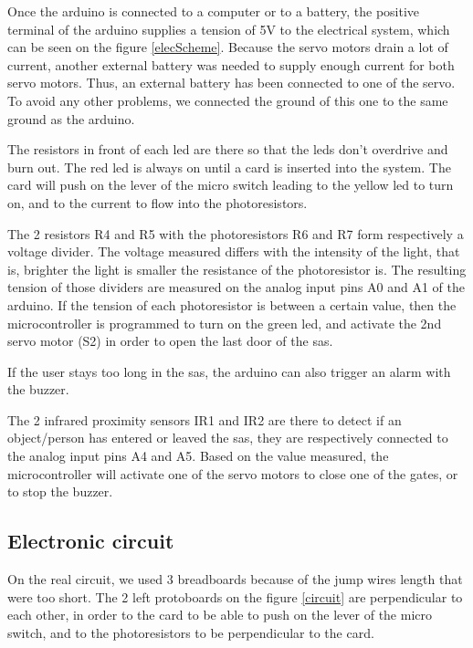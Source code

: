 Once the arduino is connected to a computer or to a battery, the positive terminal of the arduino supplies a tension of 5V to the electrical system, which can be seen on the figure \ref{elecScheme}. Because the servo motors drain a lot of current, another external battery was needed to supply enough current for both servo motors. Thus, an external battery has been connected to one of the servo. To avoid any other problems, we connected the ground of this one to the same ground as the arduino.

The resistors in front of each led are there so that the leds don't overdrive and burn out. The red led is always on until a card is inserted into the system. The card will push on the lever of the micro switch leading to the yellow led to turn on, and to the current to flow into the photoresistors.

The 2 resistors R4 and R5 with the photoresistors R6 and R7 form respectively a voltage divider. The voltage measured differs with the intensity of the light, that is, brighter the light is smaller the resistance of the photoresistor is. The resulting tension of those dividers are measured on the analog input pins A0 and A1 of the arduino. If the tension of each photoresistor is between a certain value, then the microcontroller is programmed to turn on the green led, and activate the 2nd servo motor (S2) in order to open the last door of the sas. 

If the user stays too long in the sas, the arduino can also trigger an alarm with the buzzer.

The 2 infrared proximity sensors IR1 and IR2 are there to detect if an object/person has entered or leaved the sas, they are respectively connected to the analog input pins A4 and A5. Based on the value measured, the microcontroller will activate one of the servo motors to close one of the gates, or to stop the buzzer.

\subsection{Electronic circuit}
On the real circuit, we used 3 breadboards because of the jump wires length that were too short. The 2 left protoboards on the figure \ref{circuit} are perpendicular to each other, in order to the card to be able to push on the lever of the micro switch, and to the photoresistors to be perpendicular to the card.

